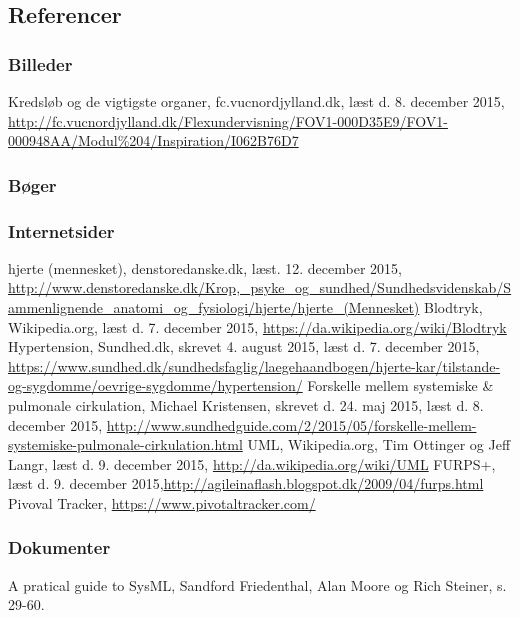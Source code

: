 \begin{thebibliography}{99}
\section{Referencer}
\subsubsection{Billeder}
Kredsløb og de vigtigste organer, fc.vucnordjylland.dk, læst d. 8. december 2015, \url{http://fc.vucnordjylland.dk/Flexundervisning/FOV1-000D35E9/FOV1-000948AA/Modul\%204/Inspiration/I062B76D7}
\subsubsection{Bøger}

\subsubsection{Internetsider}
hjerte (mennesket), denstoredanske.dk, læst. 12. december 2015, \url{http://www.denstoredanske.dk/Krop,_psyke_og_sundhed/Sundhedsvidenskab/Sammenlignende_anatomi_og_fysiologi/hjerte/hjerte_(Mennesket)}
Blodtryk, Wikipedia.org, læst d. 7. december 2015, \url{https://da.wikipedia.org/wiki/Blodtryk}
Hypertension, Sundhed.dk, skrevet 4. august 2015, læst d. 7. december 2015,
\url{https://www.sundhed.dk/sundhedsfaglig/laegehaandbogen/hjerte-kar/tilstande-og-sygdomme/oevrige-sygdomme/hypertension/}
Forskelle mellem systemiske \& pulmonale cirkulation, Michael Kristensen, skrevet d. 24. maj 2015, læst d. 8. december 2015, \url{http://www.sundhedguide.com/2/2015/05/forskelle-mellem-systemiske-pulmonale-cirkulation.html}
UML, Wikipedia.org, Tim Ottinger og Jeff Langr, læst d. 9. december 2015, \url{http://da.wikipedia.org/wiki/UML}
FURPS+, læst d. 9. december 2015,\url{http://agileinaflash.blogspot.dk/2009/04/furps.html}
Pivoval Tracker, \url{https://www.pivotaltracker.com/}
\subsubsection{Dokumenter}
A pratical guide to SysML, Sandford Friedenthal, Alan Moore og Rich Steiner, s. 29-60.
\end{thebibliography}